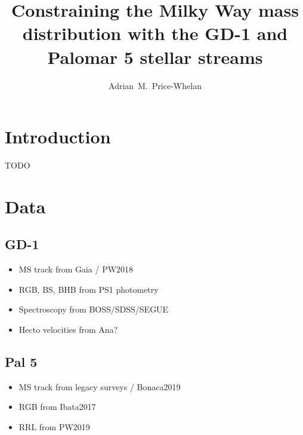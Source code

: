 \documentclass[modern]{aastex63}
\begin{document}
\title{Constraining the Milky Way mass distribution with the GD-1 and Palomar 5 stellar streams}


\author[0000-0003-0872-7098]{Adrian~M.~Price-Whelan}


\begin{abstract}
\end{abstract}


\section{Introduction} \label{sec:intro}

TODO


\section{Data} \label{sec:data}

\subsection{GD-1} \label{sec:data-gd1}

\begin{itemize}
  \item MS track from Gaia / PW2018
  \item RGB, BS, BHB from PS1 photometry
  \item Spectroscopy from BOSS/SDSS/SEGUE
  \item Hecto velocities from Ana?
\end{itemize}

\subsection{Pal 5} \label{sec:data-pal5}

\begin{itemize}
  \item MS track from legacy surveys / Bonaca2019
  \item RGB from Ibata2017
  \item RRL from PW2019
\end{itemize}
\end{document}
